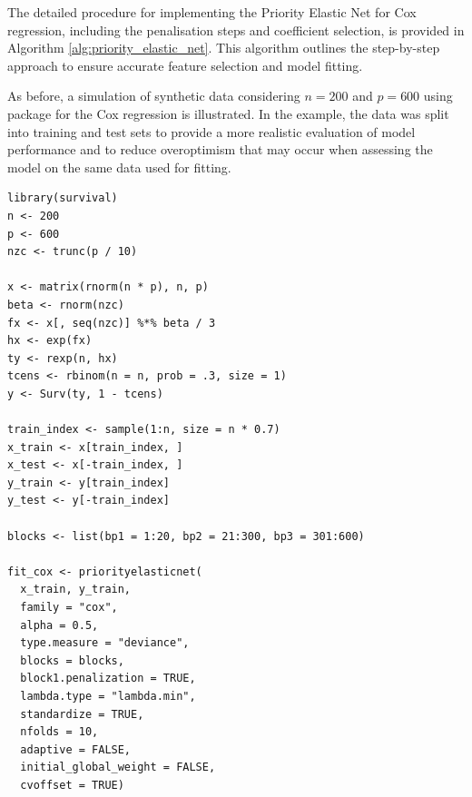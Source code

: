 The detailed procedure for implementing the Priority Elastic Net for Cox regression, including the penalisation steps and coefficient selection, is provided in Algorithm \ref{alg:priority_elastic_net}. This algorithm outlines the step-by-step approach to ensure accurate feature selection and model fitting.

As before, a simulation of synthetic data considering $n=200$ and $p=600$ using  package for the Cox regression is illustrated. In the example, the data was split into training and test sets to provide a more realistic evaluation of model performance and to reduce overoptimism that may occur when assessing the model on the same data used for fitting.
{\small
\begin{lstlisting}
library(survival)
n <- 200 
p <- 600  
nzc <- trunc(p / 10)

x <- matrix(rnorm(n * p), n, p)
beta <- rnorm(nzc)
fx <- x[, seq(nzc)] %*% beta / 3
hx <- exp(fx)
ty <- rexp(n, hx)
tcens <- rbinom(n = n, prob = .3, size = 1)
y <- Surv(ty, 1 - tcens)

train_index <- sample(1:n, size = n * 0.7)
x_train <- x[train_index, ]
x_test <- x[-train_index, ]
y_train <- y[train_index]
y_test <- y[-train_index]

blocks <- list(bp1 = 1:20, bp2 = 21:300, bp3 = 301:600)

fit_cox <- priorityelasticnet(
  x_train, y_train, 
  family = "cox", 
  alpha = 0.5, 
  type.measure = "deviance", 
  blocks = blocks,
  block1.penalization = TRUE,
  lambda.type = "lambda.min",
  standardize = TRUE,
  nfolds = 10,
  adaptive = FALSE,
  initial_global_weight = FALSE,
  cvoffset = TRUE)
\end{lstlisting}
}

